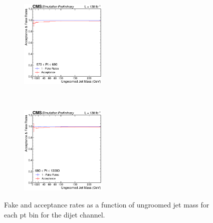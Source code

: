 \begin{figure}[htp!]
\begin{subfigure}
              \end{subfigure}
              \begin{subfigure}
		\centering
		\includegraphics[width=0.45\textwidth]{figures/multijet/dijet/fakerates_ungroomed_3.pdf}
              \end{subfigure}\\
              \begin{subfigure}
		\centering
		\includegraphics[width=0.45\textwidth]{figures/multijet/dijet/fakerates_ungroomed_4.pdf}
              \end{subfigure}
              	\caption{Fake and acceptance rates as a function of ungroomed jet mass for each pt bin for the dijet channel.}
	\label{fig:fakeratesbinned_dijet_u}
      \end{figure}
      
